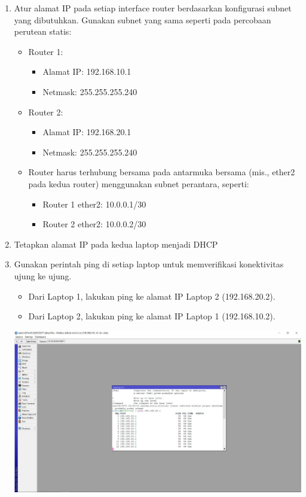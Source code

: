 \begin{enumerate}
\begin{enumerate}
\begin{itemize}
        \end{itemize}
        \item Atur alamat IP pada setiap interface router berdasarkan konfigurasi subnet yang dibutuhkan. Gunakan subnet yang sama seperti pada percobaan perutean statis:
        \begin{itemize}
            \item Router 1:
            \begin{itemize}
                \item Alamat IP: 192.168.10.1
                \item Netmask: 255.255.255.240
            \end{itemize}
            \item Router 2:
            \begin{itemize}
                \item Alamat IP: 192.168.20.1
                \item Netmask: 255.255.255.240
            \end{itemize}
            \item Router harus terhubung bersama pada antarmuka bersama (mis., ether2 pada kedua router) menggunakan subnet perantara, seperti:
            \begin{itemize}
                \item Router 1 ether2: 10.0.0.1/30
                \item Router 2 ether2: 10.0.0.2/30
            \end{itemize}
        \end{itemize}
        \item Tetapkan alamat IP pada kedua laptop menjadi DHCP
        \item Gunakan perintah ping di setiap laptop untuk memverifikasi konektivitas ujung ke ujung.
        \begin{itemize}
            \item Dari Laptop 1, lakukan ping ke alamat IP Laptop 2 (192.168.20.2).
            \item Dari Laptop 2, lakukan ping ke alamat IP Laptop 1 (192.168.10.2).
        \end{itemize}
        \begin{center}
		    \includegraphics[scale=0.4]{P1/img/1-10.jpg}

\end{center}
\end{enumerate}
\end{enumerate}

